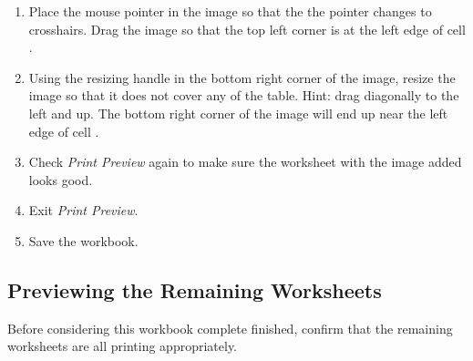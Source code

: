 \begin{enumerate}
	\item Place the mouse pointer in the image so that the the pointer changes to crosshairs. Drag the image so that the top left corner is at the left edge of cell .
	\item Using the resizing handle in the bottom right corner of the image, resize the image so that it does not cover any of the table. Hint: drag diagonally to the left and up. The bottom right corner of the image will end up near the left edge of cell .
	\item Check \textit{Print Preview} again to make sure the worksheet with the image added looks good.
	\item Exit \textit{Print Preview}. 
	\item Save the  workbook.
\end{enumerate}

\subsection{Previewing the Remaining Worksheets}

Before considering this workbook complete finished, confirm that the remaining worksheets are all printing appropriately.

